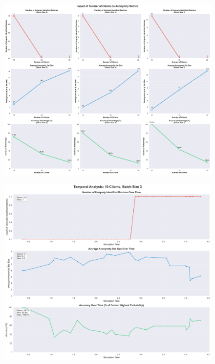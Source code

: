 \documentclass[twocolumn]{article}
\begin{document}
\begin{figure}[!htb]
\centering
\includegraphics[width=\textwidth]{diagrams/client_analysis.png}
\label{fig:client_analysis}
\end{figure}


\begin{figure}[!htb]
\centering
\includegraphics[width=\textwidth]{diagrams/temporal_analysis_10_3.png}
\label{fig:temporal_analysis_10_3}
\end{figure}
\end{document}
